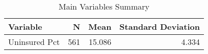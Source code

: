 \begin{table}[H]

\caption{\label{tab:tab:replicatetable2a}Main Variables Summary}
\centering
\begin{tabular}[t]{lrrr}
\toprule
Variable & N & Mean & Standard Deviation\\
\midrule
Uninsured Pct & 561 & 15.086 & 4.334\\
\bottomrule
\end{tabular}
\end{table}

